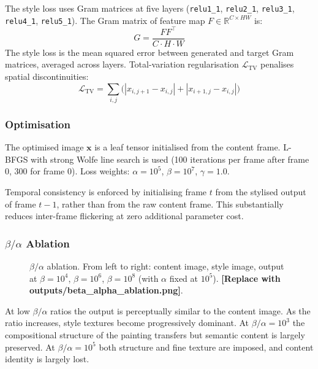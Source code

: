 \documentclass[11pt,a4paper]{article}
\begin{document}
The style loss uses Gram matrices at five layers
(\texttt{relu1\_1}, \texttt{relu2\_1}, \texttt{relu3\_1}, \texttt{relu4\_1},
\texttt{relu5\_1}). The Gram matrix of feature map $F \in \mathbb{R}^{C \times HW}$ is:
\begin{equation}
  G = \frac{F F^\top}{C \cdot H \cdot W}
\end{equation}
The style loss is the mean squared error between generated and target Gram matrices,
averaged across layers. Total-variation regularisation $\mathcal{L}_{\text{TV}}$ penalises
spatial discontinuities:
\begin{equation}
  \mathcal{L}_{\text{TV}} = \sum_{i,j}\bigl(|x_{i,j+1}-x_{i,j}| + |x_{i+1,j}-x_{i,j}|\bigr)
\end{equation}

\subsubsection{Optimisation}

The optimised image $\mathbf{x}$ is a leaf tensor initialised from the content frame.
L-BFGS with strong Wolfe line search is used (100 iterations per frame after frame 0,
300 for frame 0). Loss weights: $\alpha = 10^5$, $\beta = 10^7$, $\gamma = 1.0$.

Temporal consistency is enforced by initialising frame $t$ from the stylised output of
frame $t-1$, rather than from the raw content frame. This substantially reduces
inter-frame flickering at zero additional parameter cost.

\subsubsection{\texorpdfstring{$\beta/\alpha$}{beta/alpha} Ablation}

\begin{figure}[h]
\centering
\fbox{\rule{0pt}{4cm}\rule{\linewidth}{0pt}}
\caption{$\beta/\alpha$ ablation. From left to right: content image, style image,
output at $\beta = 10^4$, $\beta = 10^6$, $\beta = 10^8$ (with $\alpha$ fixed at $10^5$).
\textbf{[Replace with outputs/beta\_alpha\_ablation.png]}.}
\label{fig:ablation_ba}
\end{figure}

At low $\beta/\alpha$ ratios the output is perceptually similar to the content image.
As the ratio increases, style textures become progressively dominant. At $\beta/\alpha =
10^3$ the compositional structure of the painting transfers but semantic content is
largely preserved. At $\beta/\alpha = 10^5$ both structure and fine texture are imposed,
and content identity is largely lost.
\end{document}
